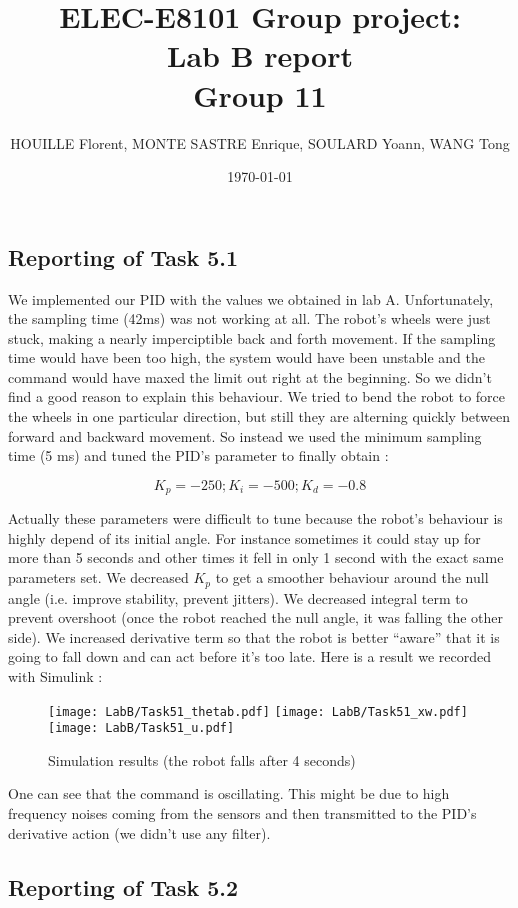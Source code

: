 \documentclass[11pt]{article}
\title{\Huge ELEC-E8101 Group project: \\ Lab B report \\ Group 11}
\date{\today}
\author{HOUILLE Florent, MONTE SASTRE Enrique, SOULARD Yoann, WANG Tong}
\begin{document}
\maketitle

\subsection*{Reporting of Task 5.1}

We implemented our PID with the values we obtained in lab A. Unfortunately, the sampling time (42ms) was not working at all. The robot's wheels were just stuck, making a nearly imperciptible back and forth movement. If the sampling time would have been too high, the system would have been unstable and the command would have maxed the limit out right at the beginning. So we didn't find a good reason to explain this behaviour. We tried to bend the robot to force the wheels in one particular direction, but still they are alterning quickly between forward and backward movement.
So instead we used the minimum sampling time (5 ms) and tuned the PID's parameter to finally obtain :

\begin{equation*}
K_p=-250   ;   K_i=-500   ;   K_d=-0.8
\end{equation*}

Actually these parameters were difficult to tune because the robot's behaviour is highly depend of its initial angle. For instance sometimes it could stay up for more than 5 seconds and other times it fell in only 1 second with the exact same parameters set. We decreased $K_p$ to get a smoother behaviour around the null angle (i.e. improve stability, prevent jitters). We decreased integral term to prevent overshoot (once the robot reached the null angle, it was falling the other side). We increased derivative term so that the robot is better ``aware'' that it is going to fall down and can act before it's too late. Here is a result we recorded with Simulink :
\begin{figure}[H]
  \texttt{[image: LabB/Task51\_thetab.pdf]}
  \texttt{[image: LabB/Task51\_xw.pdf]}
  \texttt{[image: LabB/Task51\_u.pdf]}
  \caption{Simulation results (the robot falls after 4 seconds)}
  \label{fig:fig1}
\end{figure}

One can see that the command is oscillating. This might be due to high frequency noises coming from the sensors and then transmitted to the PID's derivative action (we didn't use any filter).

\subsection*{Reporting of Task 5.2}
\end{document}
